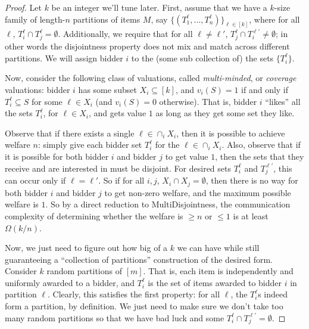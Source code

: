   \begin{proof}
    Let $k$ be an integer we'll tune later.
    First, assume that we have
    a $k$-size family of length-$n$ partitions of items $M$, say
    $\{(T_1^\ell,\ldots, T_n^\ell)\}_{\ell \in [k]}$,
    where for all $\ell$, $T_i^\ell \cap T_j^\ell = \emptyset$.
    Additionally, we require that for
    all $\ell \neq \ell'$, $T_j^\ell \cap T_i^{\ell'} \neq \emptyset$;
    in other words the disjointness property does not mix and match
    across different partitions.
    We will assign bidder $i$ to the (some sub collection of) the sets
    $\{T^\ell_i\}$.

    Now, consider the following class of valuations, called \emph{multi-minded}, or
    \emph{coverage} valuations: bidder $i$ has some subset $X_i \subseteq [k]$, and
    $v_i(S) = 1$ if and only if $T_i^\ell \subseteq S$ for some $\ell \in X_i$ (and
    $v_i(S) = 0$ otherwise). That is, bidder $i$ ``likes'' all the sets $T_i^\ell$,
    for $\ell \in X_i$, and gets value $1$ as long as they get some set they like. 

    Observe that if there exists a single $\ell \in \cap_i X_i$, then it is possible
    to achieve welfare $n$: simply give each bidder set $T_i^\ell$ for the $\ell \in
    \cap_i X_i$. Also, observe that if it is possible for both bidder $i$ and bidder
    $j$ to get value $1$, then the sets that they receive and are interested in must
    be disjoint. For desired sets $T_i^\ell$ and $T_j^{\ell'}$, this can occur
    only if $\ell = \ell'$.
    So if for all $i, j$, $X_i \cap X_j = \emptyset$,
    then there is no way for both bidder $i$ and bidder $j$
    to get non-zero welfare, and the maximum possible welfare is $1$. So by a direct
    reduction to MultiDisjointness, the communication complexity of determining
    whether the welfare is $\geq n$ or $\leq 1$ is at least $\Omega(k/n)$. 

    Now, we just need to figure out how big of a $k$ we can have while still
    guaranteeing a ``collection of partitions''
    construction of the desired form. Consider $k$ random
    partitions of $[m]$. That is, each item is independently and uniformly awarded
    to a bidder, and $T_i^\ell$ is the set of items awarded to bidder $i$ in
    partition $\ell$. Clearly, this satisfies the first property: for all $\ell$,
    the $T_i^\ell$s indeed form a partition, by definition. We just need to make
    sure we don't take too many random partitions so that we have bad luck and some
    $T_i^\ell \cap T_j^{\ell'}= \emptyset$. 


\end{proof}

